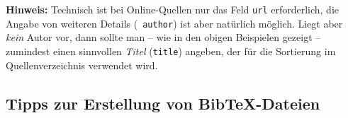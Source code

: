 \noindent\textbf{Hinweis:}
Technisch ist bei Online-Quellen nur das Feld \texttt{url} erforderlich,
die Angabe von weiteren Details (\zB\ \texttt{author}) ist aber natürlich möglich.
Liegt aber \emph{kein} Autor vor, dann sollte man -- wie in den obigen Beispielen gezeigt --
zumindest einen sinnvollen \emph{Titel} (\texttt{title}) angeben, 
der für die Sortierung im Quellenverzeichnis verwendet wird.


%

%


\subsection{Tipps zur Erstellung von BibTeX-Dateien}
\label{sec:TippsZuBibtex}

